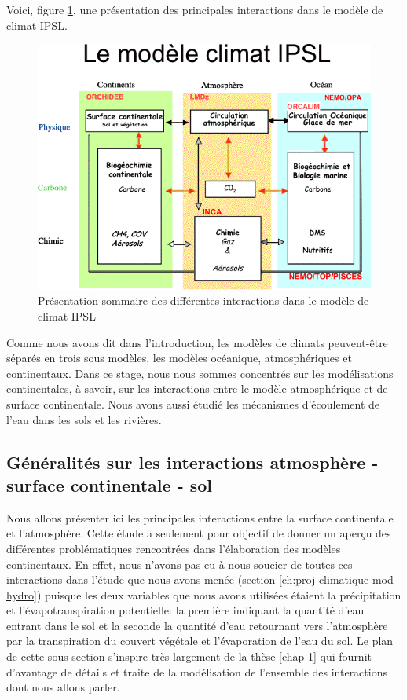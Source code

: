 \documentclass[a4paper,11pt]{article}
\numberwithin{equation}{section}
\begin{document}
Voici, figure \ref{fig-modele de climat}, une présentation des principales interactions dans le modèle de climat IPSL.

\begin{figure}[H]
	\begin{center}
		\includegraphics[scale=0.6]{modele_climat_IPSL.png}
	\end{center}
	\caption{Présentation sommaire des différentes interactions dans le modèle de climat IPSL}
	\label{fig-modele de climat}
\end{figure}

Comme nous avons dit dans l'introduction, les modèles de climats peuvent-être séparés en trois sous modèles, les modèles océanique, atmosphériques et continentaux. Dans ce stage, nous nous sommes concentrés sur les modélisations continentales, à savoir, sur les interactions entre le modèle atmosphérique et de surface continentale. Nous avons aussi étudié les mécanismes d'écoulement de l'eau dans les sols et les rivières. 

\subsection{Généralités sur les interactions atmosphère - surface continentale - sol}
\label{ch:generalite interaction atmosphere-surface continentale-sol}
Nous allons présenter ici les principales interactions entre la surface continentale et l'atmosphère. Cette étude a seulement pour objectif de donner un aperçu des différentes problématiques rencontrées dans l'élaboration des modèles continentaux. En effet, nous n'avons pas eu à nous soucier de toutes ces interactions dans l'étude que nous avons menée (section \ref{ch:proj-climatique-mod-hydro}) puisque les deux variables que nous avons utilisées étaient la précipitation et l'évapotranspiration potentielle: la première indiquant la quantité d'eau entrant dans le sol et la seconde la quantité d'eau retournant vers l'atmosphère par la transpiration du couvert végétale et l'évaporation de l'eau du sol. Le plan de cette sous-section s'inspire très largement de la thèse \cite{maquin2016developpement}[chap 1] qui fournit d'avantage de détails et traite de la modélisation de l'ensemble des interactions dont nous allons parler.
\end{document}
